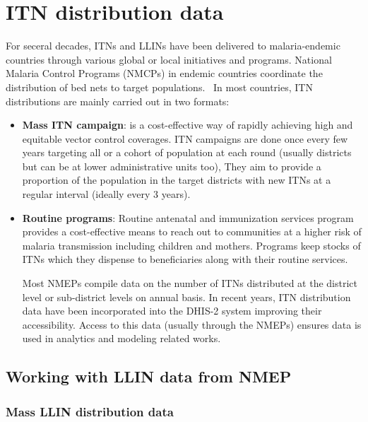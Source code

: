 \documentclass[
  letterpaper,
  DIV=11,
  numbers=noendperiod]{scrreprt}
\begin{document}

\chapter{\texorpdfstring{\textbf{ITN distribution
data}}{ITN distribution data}}\label{itn-distribution-data}

For seceral decades, ITNs and LLINs have been delivered to
malaria-endemic countries through various global or local initiatives
and programs. National Malaria Control Programs (NMCPs) in endemic
countries coordinate the distribution of bed nets to target
populations.~ In most countries, ITN distributions are mainly carried
out in two formats:

\begin{itemize}
\item
  \textbf{Mass ITN campaign}: is a cost-effective way of rapidly
  achieving high and equitable vector control coverages. ITN campaigns
  are done once every few years targeting all or a cohort of population
  at each round (usually districts but can be at lower administrative
  units too), They aim to provide a proportion of the population in the
  target districts with new ITNs at a regular interval (ideally every 3
  years).
\item
  \textbf{Routine programs}: Routine antenatal and immunization services
  program provides a cost-effective means to reach out to communities at
  a higher risk of malaria transmission including children and mothers.
  Programs keep stocks of ITNs which they dispense to beneficiaries
  along with their routine services.

  Most NMEPs compile data on the number of ITNs distributed at the
  district level or sub-district levels on annual basis. In recent
  years, ITN distribution data have been incorporated into the DHIS-2
  system improving their accessibility. Access to this data (usually
  through the NMEPs) ensures data is used in analytics and modeling
  related works.
\end{itemize}

\section{Working with LLIN data from
NMEP}\label{working-with-llin-data-from-nmep}

\subsection{\texorpdfstring{\textbf{Mass LLIN distribution
data}}{Mass LLIN distribution data}}\label{mass-llin-distribution-data}
\end{document}
